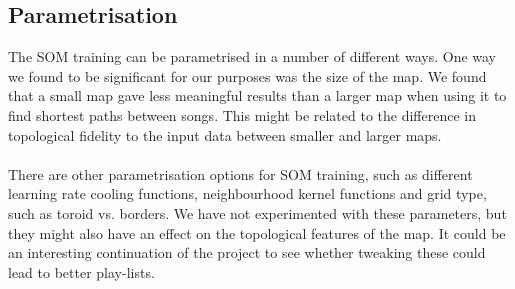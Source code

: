 \subsection{Parametrisation} %
\label{sub:parametrisation}

The SOM training can be parametrised in a number of different ways. One way we found to be significant for our purposes was the size of the map. We found that a small map gave less meaningful results than a larger map when using it to find shortest paths between songs. This might be related to the difference in topological fidelity to the input data between smaller and larger maps.
\\\\
There are other parametrisation options for SOM training, such as different learning rate cooling functions, neighbourhood kernel functions and grid type, such as toroid vs. borders. We have not experimented with these parameters, but they might also have an effect on the topological features of the map. It could be an interesting continuation of the project to see whether tweaking these could lead to better play-lists.


